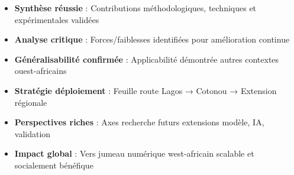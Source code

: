 \begin{keypointsbox}
    \begin{itemize}
        \item \textbf{Synthèse réussie} : Contributions méthodologiques, techniques et expérimentales validées
        \item \textbf{Analyse critique} : Forces/faiblesses identifiées pour amélioration continue
        \item \textbf{Généralisabilité confirmée} : Applicabilité démontrée autres contextes ouest-africains
        \item \textbf{Stratégie déploiement} : Feuille route Lagos → Cotonou → Extension régionale
        \item \textbf{Perspectives riches} : Axes recherche futurs extensions modèle, IA, validation
        \item \textbf{Impact global} : Vers jumeau numérique west-africain scalable et socialement bénéfique
    \end{itemize}
\end{keypointsbox}